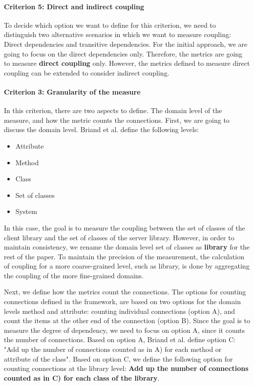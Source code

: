 \documentclass[a4paper]{article}
\begin{document}
\paragraph{Criterion 5: Direct and indirect coupling}
To decide which option we want to define for this criterion, we need to distinguish two alternative scenarios in which we want to measure coupling: Direct dependencies and transitive dependencies. For the initial approach, we are going to focus on the direct dependencies only. Therefore, the metrics are going to measure \textbf{direct coupling} only. However, the metrics defined to measure direct coupling can be extended to consider indirect coupling.

\paragraph{Criterion 3: Granularity of the measure}
In this criterion, there are two aspects to define. The domain level of the measure, and how the metric counts the connections. First, we are going to discuss the domain level. Briand et al. define the following levels:

\begin{itemize}[noitemsep]
  \item Attribute
  \item Method
  \item Class
  \item Set of classes
  \item System
\end{itemize}

In this case, the goal is to measure the coupling between the set of classes of the client library and the set of classes of the server library. However, in order to maintain consistency, we rename the domain level set of classes as \textbf{library} for the rest of the paper. To maintain the precision of the measurement, the calculation of coupling for a more coarse-grained level, such as library, is done by aggregating the coupling of the more fine-grained domains.

Next, we define how the metrics count the connections. The options for counting connections defined in the framework, are based on two options for the domain levels method and attribute: counting individual connections (option A), and count the items at the other end of the connection (option B). Since the goal is to measure the degree of dependency, we need to focus on option A, since it counts the number of connections. Based on option A, Briand et al. define option C: "Add up the number of connections counted as in A) for each method or attribute of the class". Based on option C, we define the following option for counting connections at the library level: \textbf{Add up the number of connections counted as in C) for each class of the library}.
\end{document}

